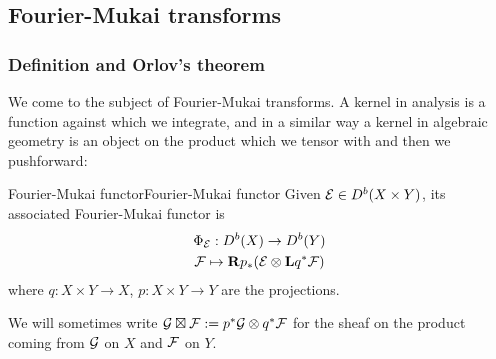 


\subsection{Fourier-Mukai transforms}
\subsubsection{Definition and Orlov's theorem}
We come to the subject of Fourier-Mukai transforms. A kernel in analysis is a function against which we integrate, and in a similar way a kernel in algebraic geometry is an object on the product which we tensor with and then we pushforward:

\begin{definition}{Fourier-Mukai functor}{Fourier-Mukai functor}
    Given $\mathcal{E}\in D^b(X\times Y)$, its associated Fourier-Mukai functor is
    \begin{gather*}
        \Phi_{\mathcal{E}} : D^b(X)\to D^b(Y) \\
        \mathcal{F} \mapsto \mathbf{R} p_{*}(\mathcal{E}\otimes\mathbf{L} q^*\mathcal{F})
    \end{gather*}
    where $q:X\times Y\to X$, $p:X\times Y\to Y$ are the projections.
\end{definition}

We will sometimes write $\mathcal{G} \boxtimes \mathcal{F} := p^* \mathcal{G} \otimes q^* \mathcal{F}$ for the sheaf on the product coming from $\mathcal{G}$ on $X$ and $\mathcal{F}$ on $Y$.

